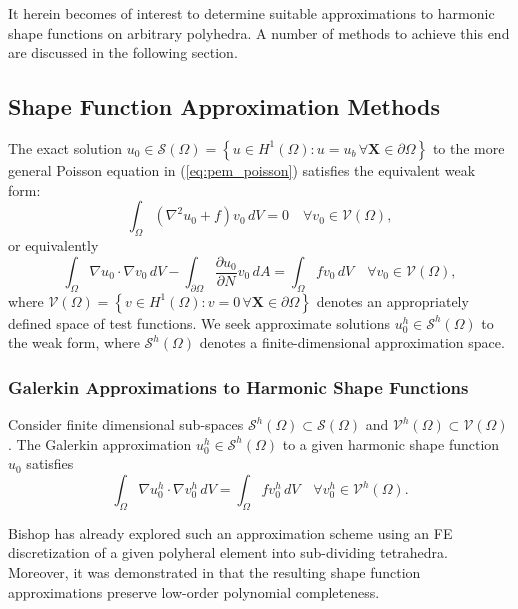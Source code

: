 	It herein becomes of interest to determine suitable approximations to harmonic shape functions on arbitrary polyhedra. A number of methods to achieve this end are discussed in the following section.
	
\subsection*{Shape Function Approximation Methods}
	
	The exact solution $u_0 \in \mathcal{S} (\Omega) = \left\{ u \in H^1(\Omega) : u = u_b \, \forall \mathbf{X} \in \partial \Omega \right\}$ to the more general Poisson equation in (\ref{eq:pem_poisson}) satisfies the equivalent weak form:
	\begin{equation}
		\int_\Omega (\nabla^2 u_0 + f) v_0 \, dV = 0 \quad \forall v_0 \in \mathcal{V} (\Omega),
	\end{equation}
	or equivalently
	\begin{equation}
		\int_\Omega \nabla u_0 \cdot \nabla v_0 \, dV - \int_{\partial \Omega} \frac{\partial u_0}{\partial N} v_0 \, dA = \int_\Omega f v_0 \, dV \quad \forall v_0 \in \mathcal{V} (\Omega),
		\label{eq:weak_bvp}
	\end{equation}
	where $\mathcal{V} (\Omega) = \left\{ v \in H^1(\Omega) : v = 0 \, \forall \mathbf{X} \in \partial \Omega \right\}$ denotes an appropriately defined space of test functions. We seek approximate solutions $u^h_0 \in \mathcal{S}^h (\Omega)$ to the weak form, where $\mathcal{S}^h (\Omega)$ denotes a finite-dimensional approximation space.
	
\subsubsection*{Galerkin Approximations to Harmonic Shape Functions}

	Consider finite dimensional sub-spaces $\mathcal{S}^h (\Omega) \subset \mathcal{S} (\Omega)$ and $\mathcal{V}^h (\Omega) \subset \mathcal{V} (\Omega)$. The Galerkin approximation $u^h_0 \in \mathcal{S}^h (\Omega)$ to a given harmonic shape function $u_0$ satisfies
	\begin{equation}
		\int_\Omega \nabla u^h_0 \cdot \nabla v^h_0 \, dV = \int_\Omega f v^h_0 \, dV \quad \forall v^h_0 \in \mathcal{V}^h (\Omega).
		\label{eq:weak_poisson}
	\end{equation}
	
	Bishop has already explored such an approximation scheme using an FE discretization of a given polyheral element into sub-dividing tetrahedra. Moreover, it was demonstrated in \cite{Bishop:14} that the resulting shape function approximations preserve low-order polynomial completeness. 
	
